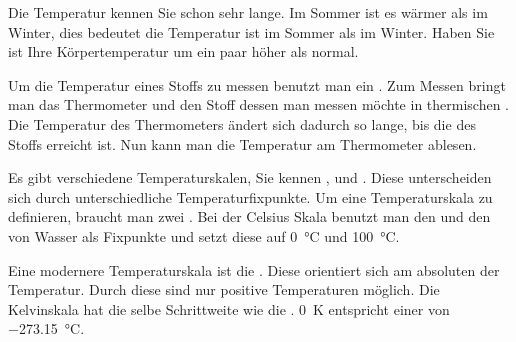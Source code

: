
\StartLueckentext

Die Temperatur kennen Sie schon sehr lange.
Im Sommer ist es wärmer als im Winter, dies bedeutet die Temperatur ist im Sommer  als im Winter.
Haben Sie  ist Ihre Körpertemperatur um ein paar  höher als normal.

Um die Temperatur eines Stoffs zu messen benutzt man ein .
Zum Messen bringt man das Thermometer und den Stoff dessen  man messen möchte in thermischen .
Die Temperatur des Thermometers ändert sich dadurch so lange, bis die  des Stoffs erreicht ist.
Nun kann man die Temperatur am Thermometer ablesen.

Es gibt verschiedene Temperaturskalen, Sie kennen ,  und .
Diese  unterscheiden sich durch unterschiedliche Temperaturfixpunkte.
Um eine Temperaturskala zu definieren, braucht man zwei . 
Bei der Celsius Skala benutzt man den  und den  von Wasser als Fixpunkte und setzt diese auf \SI{0}{\celsius} und \SI{100}{\celsius}.

Eine modernere Temperaturskala ist die . 
Diese orientiert sich am absoluten  der Temperatur.
Durch diese  sind nur positive Temperaturen möglich.
Die Kelvinskala hat die selbe Schrittweite wie die .
\SI{0}{K} entspricht einer  von \SI{-273.15}{\celsius}.

\StoppLueckentext

